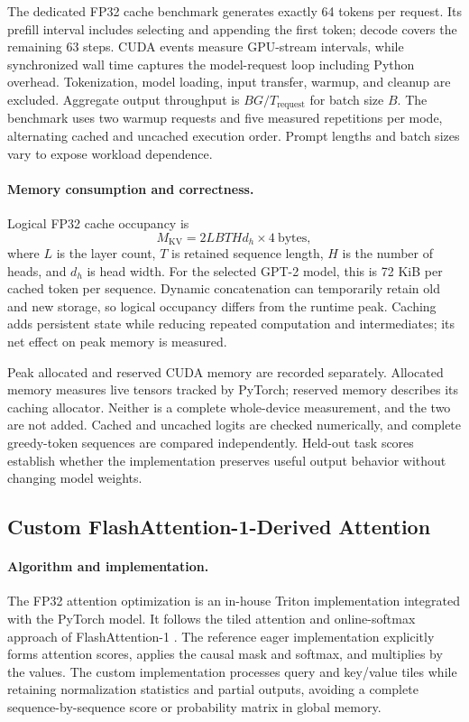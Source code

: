 The dedicated FP32 cache benchmark generates exactly 64 tokens per request. Its prefill interval includes selecting and appending the first token; decode covers the remaining 63 steps. CUDA events measure GPU-stream intervals, while synchronized wall time captures the model-request loop including Python overhead. Tokenization, model loading, input transfer, warmup, and cleanup are excluded. Aggregate output throughput is $BG/T_{\mathrm{request}}$ for batch size $B$. The benchmark uses two warmup requests and five measured repetitions per mode, alternating cached and uncached execution order. Prompt lengths and batch sizes vary to expose workload dependence.

\paragraph{Memory consumption and correctness.}
Logical FP32 cache occupancy is
\begin{equation}
 M_{\mathrm{KV}}=2LBTHd_h\times4\ \mathrm{bytes},
\end{equation}
where $L$ is the layer count, $T$ is retained sequence length, $H$ is the number of heads, and $d_h$ is head width. For the selected GPT-2 model, this is 72 KiB per cached token per sequence. Dynamic concatenation can temporarily retain old and new storage, so logical occupancy differs from the runtime peak. Caching adds persistent state while reducing repeated computation and intermediates; its net effect on peak memory is measured.

Peak allocated and reserved CUDA memory are recorded separately. Allocated memory measures live tensors tracked by PyTorch; reserved memory describes its caching allocator. Neither is a complete whole-device measurement, and the two are not added. Cached and uncached logits are checked numerically, and complete greedy-token sequences are compared independently. Held-out task scores establish whether the implementation preserves useful output behavior without changing model weights.

\subsection{Custom FlashAttention-1-Derived Attention}
\label{sec:method_flash}

\paragraph{Algorithm and implementation.}
The FP32 attention optimization is an in-house Triton implementation integrated with the PyTorch model. It follows the tiled attention and online-softmax approach of FlashAttention-1 \cite{dao2022flashattention}. The reference eager implementation explicitly forms attention scores, applies the causal mask and softmax, and multiplies by the values. The custom implementation processes query and key/value tiles while retaining normalization statistics and partial outputs, avoiding a complete sequence-by-sequence score or probability matrix in global memory.


